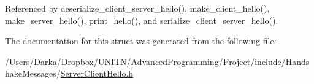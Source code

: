 Referenced by deserialize\+\_\+client\+\_\+server\+\_\+hello(), make\+\_\+client\+\_\+hello(), make\+\_\+server\+\_\+hello(), print\+\_\+hello(), and serialize\+\_\+client\+\_\+server\+\_\+hello().



The documentation for this struct was generated from the following file\+:\begin{DoxyCompactItemize}
\item 
/\+Users/\+Darka/\+Dropbox/\+U\+N\+I\+T\+N/\+Advanced\+Programming/\+Project/include/\+Handshake\+Messages/\hyperlink{_server_client_hello_8h}{Server\+Client\+Hello.\+h}\end{DoxyCompactItemize}
